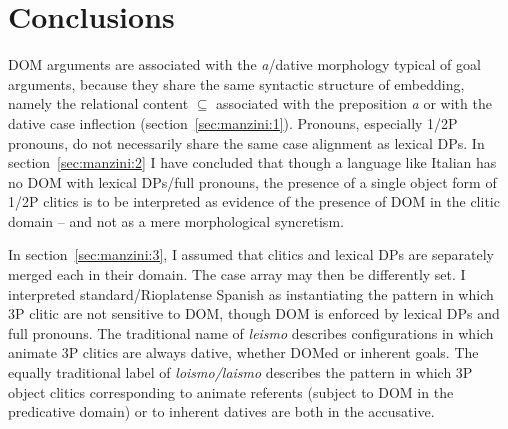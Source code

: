 \documentclass[output=paper,colorlinks,citecolor=brown]{./langscibook}
\begin{document}
\section{ Conclusions}\label{sec:manzini:4}

DOM arguments are associated with the \textit{a}/dative morphology typical of goal arguments, because they share the same syntactic structure of embedding, namely the relational content ${\subseteq}$ associated with the preposition \textit{a} or with the dative case inflection (section~\ref{sec:manzini:1}). Pronouns, especially 1/2P pronouns, do not necessarily share the same case alignment as lexical DPs. In section~\ref{sec:manzini:2} I have concluded that though a language like Italian has no DOM with lexical DPs/full pronouns, the presence of a single object form of 1/2P clitics is to be interpreted as evidence of the presence of DOM in the clitic domain – and not as a mere morphological syncretism.

In section~\ref{sec:manzini:3}, I assumed that clitics and lexical DPs are separately merged each in their domain. The case array may then be differently set. I interpreted standard/Rioplatense Spanish as instantiating the pattern in which 3P clitic are not sensitive to DOM, though DOM is enforced by lexical DPs and full pronouns. The traditional name of \textit{leismo} describes configurations in which animate 3P clitics are always dative, whether DOMed or inherent goals. The equally traditional label of \textit{loismo/laismo} describes the pattern in which 3P object clitics corresponding to animate referents (subject to DOM in the predicative domain) or to inherent datives are both in the accusative. 

\sloppy
\printbibliography[heading=subbibliography,notkeyword=this] 
\end{document}
